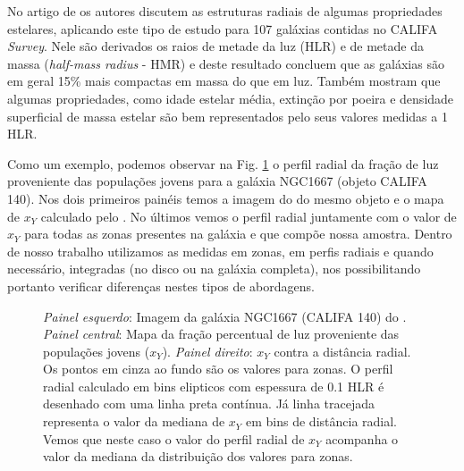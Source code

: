 No artigo de \citet{GonzalezDelgado.etal.2014a} os autores discutem as estruturas radiais de algumas
propriedades estelares, aplicando este tipo de estudo para 107 galáxias contidas no CALIFA {\em
Survey}. Nele são derivados os raios de metade da luz (HLR) e de metade da massa ({\em half-mass
radius} - HMR) e deste resultado concluem que as galáxias são em geral 15\% mais compactas em massa
do que em luz. Também mostram que algumas propriedades, como idade estelar média, extinção por
poeira e densidade superficial de massa estelar são bem representados pelo seus valores medidas a 1
HLR.

Como um exemplo, podemos observar na Fig. \ref{fig:K0140xYRadProf} o perfil radial da fração de luz
proveniente das populações jovens para a galáxia NGC1667 (objeto CALIFA 140). Nos dois primeiros
painéis temos a imagem do \SDSS do mesmo objeto e o mapa de $x_Y$ calculado pelo \starlight. No
últimos vemos o perfil radial juntamente com o valor de $x_Y$ para todas as zonas presentes na
galáxia e que compõe nossa amostra. Dentro de nosso trabalho utilizamos as medidas em zonas, em
perfis radiais e quando necessário, integradas (no disco ou na galáxia completa), nos possibilitando
portanto verificar diferenças nestes tipos de abordagens.

\begin{figure}
	\centering
	\caption[Imagem e perfil radial de $x_Y$.]
	{\emph{Painel esquerdo}: Imagem da galáxia NGC1667 (CALIFA 140) do \SDSS. \emph{Painel central}:
	Mapa da fração percentual de luz proveniente das populações jovens ($x_Y$). \emph{Painel direito}:
	$x_Y$ contra a distância radial. Os pontos em cinza ao fundo são os valores para zonas. O perfil radial
	calculado em bins elipticos com espessura de 0.1 HLR é desenhado com uma linha preta contínua. Já
	linha tracejada representa o valor da mediana de $x_Y$ em bins de distância radial. Vemos que
	neste caso o valor do perfil radial de $x_Y$ acompanha o valor da mediana da distribuição dos
	valores para zonas. }
	\label{fig:K0140xYRadProf}
\end{figure}
 
